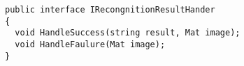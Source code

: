 
\begin{lstlisting}[style=fsharpstyle,caption={Определение интерфейса IRecongnitionResultHander}, label=lst:recognition_result_handler]
public interface IRecongnitionResultHander
{
  void HandleSuccess(string result, Mat image);
  void HandleFaulure(Mat image);
}
\end{lstlisting}